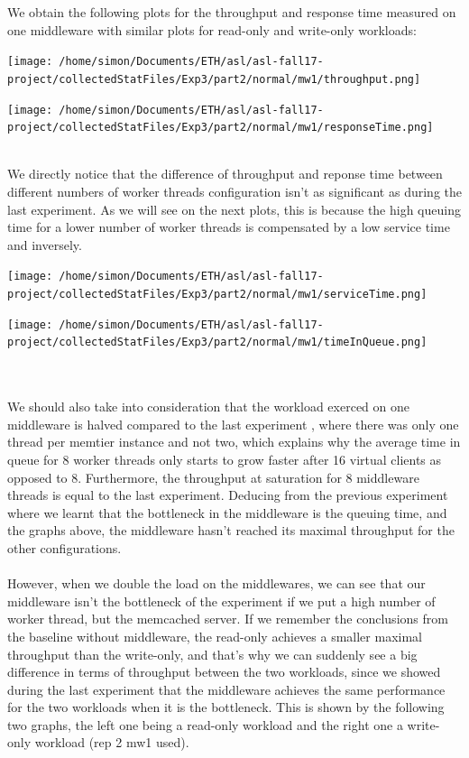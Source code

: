 \documentclass[11pt,a4paper]{article}
\begin{document}
We obtain the following plots for the throughput and response time measured on one middleware with similar plots for read-only and write-only workloads:
\\
\begin{minipage}{0.48\linewidth}
\texttt{[image: /home/simon/Documents/ETH/asl/asl-fall17-project/collectedStatFiles/Exp3/part2/normal/mw1/throughput.png]}
\end{minipage}
\hfill
\begin{minipage}{0.48\linewidth}
\texttt{[image: /home/simon/Documents/ETH/asl/asl-fall17-project/collectedStatFiles/Exp3/part2/normal/mw1/responseTime.png]}
\end{minipage}
\\
We directly notice that the difference of throughput and reponse time between different numbers of worker threads configuration isn't as significant as during the last experiment. As we will see on the next plots, this is because the high queuing time for a lower number of worker threads is compensated by a low service time and inversely. 
\\
\begin{minipage}{0.49\linewidth}
\texttt{[image: /home/simon/Documents/ETH/asl/asl-fall17-project/collectedStatFiles/Exp3/part2/normal/mw1/serviceTime.png]}
\end{minipage}
\hfill
\begin{minipage}{0.49\linewidth}
\texttt{[image: /home/simon/Documents/ETH/asl/asl-fall17-project/collectedStatFiles/Exp3/part2/normal/mw1/timeInQueue.png]}
\end{minipage}
\\\\ 
We should also take into consideration that the workload exerced on one middleware is halved compared to the last experiment , where there was only one thread per memtier instance and not two, which explains why the average time in queue for 8 worker threads only starts to grow faster after 16 virtual clients as opposed to 8. Furthermore, the throughput at saturation for 8 middleware threads is equal to the last experiment. 
Deducing from the previous experiment where we learnt that the bottleneck in the middleware is the queuing time, and the graphs above, the middleware hasn't reached its maximal throughput for the other configurations. 
\\\\
However, when we double the load on the middlewares, we can see that our middleware isn't the bottleneck of the experiment if we put a high number of worker thread, but the memcached server. If we remember the conclusions from the baseline without middleware, the read-only achieves a smaller maximal throughput than the write-only, and that's why we can suddenly see a big difference in terms of throughput between the two workloads, since we showed during the last experiment that the middleware achieves the same performance for the two workloads when it is the bottleneck. This is shown by the following two graphs, the left one being a read-only workload and the right one a write-only workload (rep 2 mw1 used).   
\end{document}
